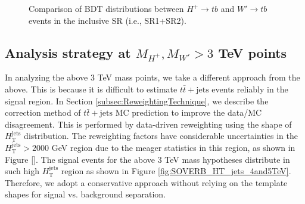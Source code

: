 \begin{description}
\begin{figure}[H]
{        }  
        \caption{Comparison of BDT distributions between $H^{+} \rightarrow tb$ and  $W' \rightarrow tb$ events in the inclusive SR (i.e., SR1+SR2).}
        \label{fig:CompHpAndWp}
    \end{figure}
    
\end{description}

\subsection{Analysis strategy at $M_{H^{+}}, M_{W'} > 3$ TeV points}
\label{subsec:AnaStrategyAbove3TeV}
In analyzing the above 3 TeV mass points, we take a different approach from the above. This is because it is difficult to estimate $t\bar{t}+\text{jets}$ events reliably in the signal region. In Section \ref{subsec:ReweightingTechnique}, we describe the correction method of $t\bar{t}+\text{jets}$ MC prediction to improve the data/MC disagreement. This is performed by data-driven reweighting using the shape of $H_{\text{T}}^{\text{jets}}$ distribution. The reweighting factors have considerable uncertainties in the $H_{\text{T}}^{\text{jets}}>2000$ GeV region due to the meager statistics in this region, as shown in Figure \ref{}. The signal events for the above 3 TeV mass hypotheses distribute in such high $H_{\text{T}}^{\text{jets}}$ region as shown in Figure \ref{fig:SOVERB_HT_jets_4and5TeV}. Therefore, we adopt a conservative approach without relying on the template shapes for signal vs. background separation.

